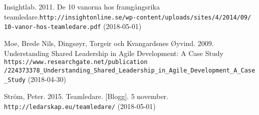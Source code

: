 \begin{thebibliography}{99}

Insightlab. 2011. De 10 vanorna hos framgångsrika teamledare.\texttt{http://insightonline.se/wp-content/uploads/sites/4/2014/09/
10-vanor-hos-teamledare.pdf}
(2018-05-01)

Moe, Brede Nils, Dingsøyr, Torgeir och Kvangardsnes Øyvind. 2009. Understanding Shared Leadership in Agile Development: A Case Study
\texttt{https://www.researchgate.net/publication
/224373378_Understanding_Shared_Leadership_in_Agile_Development_A_Case_Study}
(2018-04-30)

 Ström, Peter. 2015. Teamledare. [Blogg]. 5 november. \texttt{http://ledarskap.eu/teamledare/} 
(2018-05-01)


\end{thebibliography}